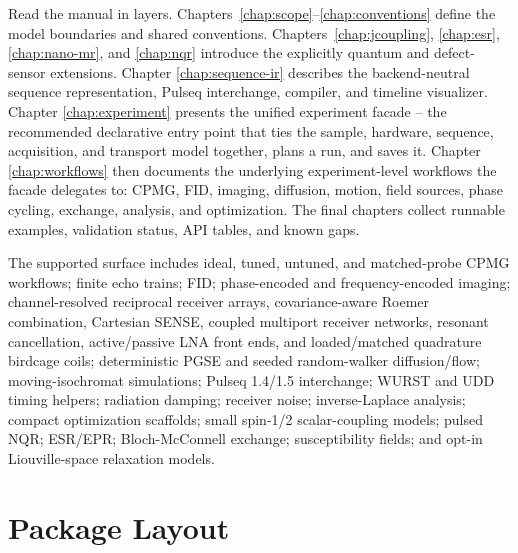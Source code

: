 \documentclass[11pt,oneside]{report}
\begin{document}
Read the manual in layers. Chapters~\ref{chap:scope}--\ref{chap:conventions}
define the model boundaries and shared conventions. Chapters~\ref{chap:jcoupling},
\ref{chap:esr}, \ref{chap:nano-mr}, and \ref{chap:nqr} introduce the explicitly
quantum and defect-sensor extensions. Chapter
\ref{chap:sequence-ir} describes the backend-neutral sequence representation,
Pulseq interchange, compiler, and timeline visualizer. Chapter
\ref{chap:experiment} presents the unified experiment facade -- the recommended
declarative entry point that ties the sample, hardware, sequence, acquisition,
and transport model together, plans a run, and saves it. Chapter
\ref{chap:workflows} then documents the underlying experiment-level workflows
the facade delegates to: CPMG, FID, imaging, diffusion, motion, field sources,
phase cycling, exchange, analysis, and optimization. The final chapters collect
runnable examples, validation status, API tables, and known gaps.

The supported surface includes ideal, tuned, untuned, and matched-probe CPMG
workflows; finite echo trains; FID; phase-encoded and frequency-encoded
imaging; channel-resolved reciprocal receiver arrays, covariance-aware Roemer
combination, Cartesian SENSE, coupled multiport receiver networks, resonant
cancellation, active/passive LNA front ends, and loaded/matched quadrature
birdcage coils; deterministic PGSE and seeded random-walker diffusion/flow;
moving-isochromat simulations; Pulseq 1.4/1.5 interchange; WURST and UDD timing
helpers; radiation damping; receiver noise; inverse-Laplace analysis; compact
optimization scaffolds; small spin-1/2 scalar-coupling models; pulsed NQR;
ESR/EPR; Bloch-McConnell exchange; susceptibility fields; and opt-in
Liouville-space relaxation models.

\section{Package Layout}
\end{document}
